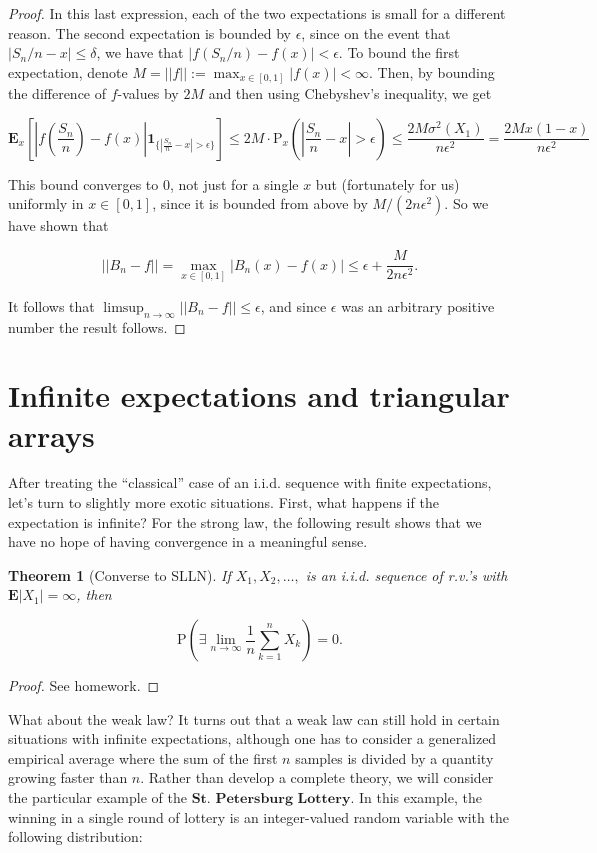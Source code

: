 \documentclass[11pt]{report}
\theoremstyle{plain}
\newtheorem{thm}{Theorem}[chapter]
\theoremstyle{definition}
\begin{document}
\begin{proof}
\noindent In this last expression, each of the two expectations
is small for a different reason. The second
expectation is bounded by $\epsilon$, since on the
event that $|S_n/n-x|\le \delta$, we have that
$|f(S_n/n)-f(x)|<\epsilon$. To bound the first
expectation, denote
$M=||f||:=\max_{x\in[0,1]}|f(x)|<\infty$. Then, by
bounding the difference of $f$-values by $2M$ and
then using Chebyshev's inequality, we get

\[
\mathbf{E}_x \left[\left|f\left(\frac{S_n}{n}\right)-f(x)\right|\mathbf{1}_{\{ \left|\frac{S_n}{n}-x\right|>\epsilon \}} \right]
\le 2M\cdot \mathrm{P}_x\left( \left|\frac{S_n}{n}-x\right|>\epsilon\right)
\le \frac{2 M \sigma^2(X_1)}{n \epsilon^2} = \frac{2 M x(1-x)}{n\epsilon^2}
\]

\noindent This bound converges to $0$, not just for a single $x$
but (fortunately for us) uniformly in $x\in[0,1]$,
since it is bounded from above by $M/(2n\epsilon^2)$.
So we have shown that

\[
||B_n-f|| = \max_{x\in[0,1]} |B_n(x)-f(x)| \le
\epsilon + \frac{M}{2n\epsilon^2}.
\]

\noindent It follows that
$\limsup_{n\to\infty} ||B_n-f|| \le \epsilon$, and
since $\epsilon$ was an arbitrary positive number the
result follows.
\end{proof}

\section{Infinite expectations and triangular arrays}

After treating the ``classical'' case of an i.i.d.
sequence with finite expectations, let's turn to
slightly more exotic situations. First, what happens
if the expectation is infinite? For the strong law,
the following result shows that we have no hope of
having convergence in a meaningful sense.

\begin{thm}[Converse to SLLN]
If $X_1,X_2,\ldots,$ is an i.i.d. sequence of r.v.'s
with $\mathbf{E}|X_1|=\infty$, then

\[
\mathrm{P}\left( \exists \lim_{n\to\infty} \frac{1}{n}\sum_{k=1}^n X_k \right) = 0.
\]

\end{thm}

\begin{proof}
See homework.
\end{proof}

\noindent What about the weak law? It turns out that a weak law
can still hold in certain situations with infinite
expectations, although one has to consider a
generalized empirical average where the sum of the
first $n$ samples is divided by a quantity growing
faster than $n$. Rather than develop a complete
theory, we will consider the particular example of the
$\textbf{St. Petersburg Lottery}$. In this example,
the winning in a single round of lottery is an
integer-valued random variable with the following
distribution:
\end{document}

